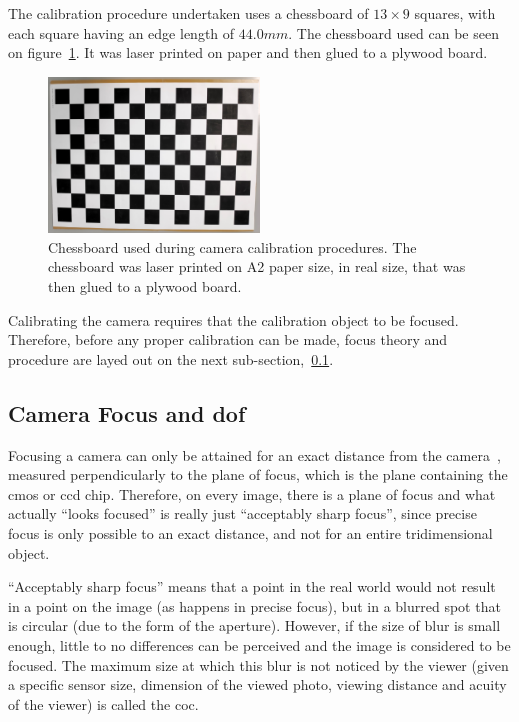 The calibration procedure undertaken uses a chessboard of $13 \times 9$ squares, with each square having an edge length of $44.0mm$. The chessboard used can be seen on figure~\ref{fig:chessboard}. It was laser printed on paper and then glued to a plywood board.

\begin{figure}[H]
	\centering
	\includegraphics[width=0.5\textwidth]{img/experimental-setup/chessboard.jpg}
	\caption{Chessboard used during camera calibration procedures. The chessboard was laser printed on A2 paper size, in real size, that was then glued to a plywood board.}
	\label{fig:chessboard}
\end{figure}

Calibrating the camera requires that the calibration object to be focused. Therefore, before any proper calibration can be made, focus theory and procedure are layed out on the next sub-section,~\ref{subsec:calibration:camera-focus}.


\subsection{Camera Focus and \acl{dof}}
\label{subsec:calibration:camera-focus}
Focusing a camera can only be attained for an exact distance from the camera~\cite{Merklinger1993, Photopillers}, measured perpendicularly to the plane of focus, which is the plane containing the \ac{cmos} or \ac{ccd} chip. Therefore, on every image, there is a plane of focus and what actually ``looks focused'' is really just ``acceptably sharp focus'', since precise focus is only possible to an exact distance, and not for an entire tridimensional object.

``Acceptably sharp focus'' means that a point in the real world would not result in a point on the image (as happens in precise focus), but in a blurred spot that is circular (due to the form of the aperture)\cite{Photopillers}. However, if the size of blur is small enough, little to no differences can be perceived and the image is considered to be focused\cite{Photopillers}. The maximum size at which this blur is not noticed by the viewer (given a specific sensor size, dimension of the viewed photo, viewing distance and acuity of the viewer) is called the \ac{coc}\cite{Photopillers, Merklinger1993}.


